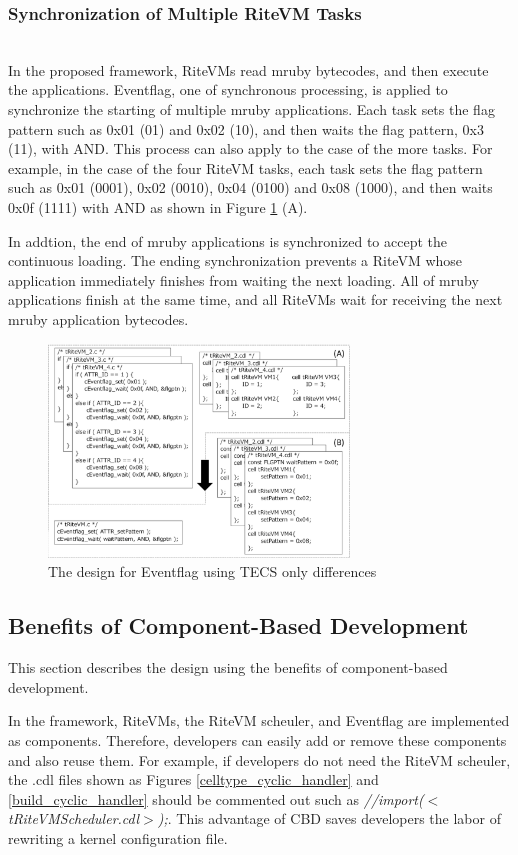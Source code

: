 \documentclass[conference,compsoc]{IEEEtran}
\begin{document}
\subsubsection{Synchronization of Multiple RiteVM Tasks} \mbox{}\\

In the proposed framework, RiteVMs read mruby bytecodes, and then execute the applications.
Eventflag, one of synchronous processing, is applied to synchronize the starting of multiple mruby applications.
Each task sets the flag pattern such as 0x01 (01) and 0x02 (10), and then waits the flag pattern, 0x3 (11), with AND.
This process can also apply to the case of the more tasks.
For example, in the case of the four RiteVM tasks, each task sets the flag pattern such as 0x01 (0001), 0x02 (0010), 0x04 (0100)  and 0x08 (1000), and then waits 0x0f (1111) with AND as shown in Figure \ref{fig:Eventflag} (A).

In addtion, the end of mruby applications is synchronized to accept the continuous loading.
The ending synchronization prevents a RiteVM whose application immediately finishes from waiting the next loading.
All of mruby applications finish at the same time, and all RiteVMs wait for receiving the next mruby application bytecodes. 

\begin{figure}[t]
    \centering
    \includegraphics[width=8cm,clip]{figure/Eventflag.pdf}
    \caption{The design for Eventflag using TECS {\scriptsize *only differences}}
    \label{fig:Eventflag}
\end{figure}

\subsection{Benefits of Component-Based Development}
This section describes the design using the benefits of component-based development.

In the framework, RiteVMs, the RiteVM scheuler, and Eventflag are implemented as components.
Therefore, developers can easily add or remove these components and also reuse them.
For example, if developers do not need the RiteVM scheuler, the .cdl files shown as Figures \ref{celltype_cyclic_handler} and \ref{build_cyclic_handler} should be commented out such as {\it //import($<$tRiteVMScheduler.cdl$>$);}.
This advantage of CBD saves developers the labor of rewriting a kernel configuration file.
\end{document}
